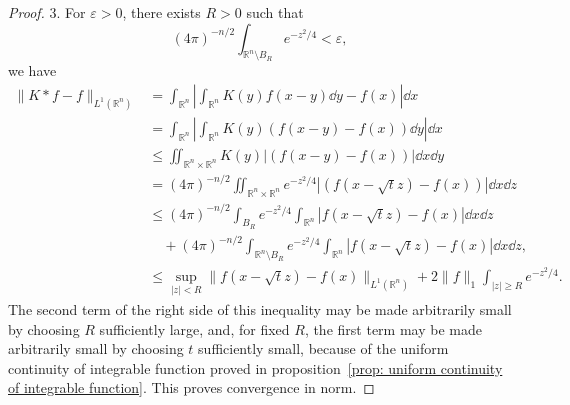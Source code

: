 \begin{proof}
	3. 	 
	For $\varepsilon>0$, there exists $R>0$ such that 
	\[
	(4\pi)^{-n/2}\int_{\mathbb R^n\setminus B_R}e^{-z^2/4}<\varepsilon,
	\]
	we have 
	\begin{align*}
		\|K*f-f\|_{L^1(\mathbb R^n)} 
		&= \int_{\mathbb{R}^n}\left|\int_{\mathbb{R}^n}K(y)f(x-y)\dd y - f(x)\right|\dd x \\
		&= \int_{\mathbb{R}^n}\left|\int_{\mathbb{R}^n}K(y)(f(x-y) - f(x))\dd y\right|\dd x\\
		&\leq \iint_{\mathbb{R}^n\times\mathbb{R}^n}K(y)|(f(x-y) - f(x))|\dd x\dd y\\
		&= (4\pi)^{-n/2}\iint_{\mathbb{R}^n\times\mathbb R^n}e^{-z^2/4}|(f(x-\sqrt tz)-f(x))|\dd x\dd z\\
		&\leq (4\pi)^{-n/2}\int_{B_R}e^{-z^2/4}\int_{\mathbb{R}^n}|f(x-\sqrt tz)-f(x)|\dd x\dd z\\
		&\quad + (4\pi)^{-n/2}\int_{\mathbb R^n\setminus B_R}e^{-z^2/4}\int_{\mathbb{R}^n}|f(x-\sqrt tz)-f(x)|\dd x\dd z,\\
		&\leq \sup_{|z|<R}\|f(x-\sqrt t z) - f(x)\|_{L^1(\mathbb R^n)} 
		+ 2\|f\|_1\int_{|z|\geq R}e^{-z^2/4}.
	\end{align*}
	The second term of the right side of this inequality 
	may be made arbitrarily small by choosing $R$ sufficiently large,
	and, for fixed $R$, 
	the first term may be made arbitrarily small by choosing $t$ sufficiently small, 
	because of the uniform continuity of integrable function proved in  proposition~\ref{prop: uniform continuity of integrable function}. 
	This proves convergence in norm.



\end{proof}
